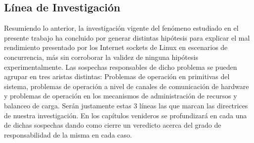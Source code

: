 \subsection{Línea de Investigación}
Resumiendo lo anterior, la investigación vigente del fenómeno estudiado en el presente trabajo ha concluido por generar distintas hipótesis para explicar el mal rendimiento presentado por los Internet sockets de Linux en escenarios de concurrencia, más sin corroborar la validez de ninguna hipótesis experimentalmente. Las sospechas responsables de dicho problema se pueden agrupar en tres aristas distintas: Problemas de operación en primitivas del sistema, problemas de operación a nivel de canales de comunicación de hardware y problemas de operación en los mecanismos de administración de recursos y balanceo de carga. Serán justamente estas 3 líneas las que marcan las directrices de nuestra investigación. En los capítulos venideros se profundizará en cada una de dichas sospechas dando como cierre un veredicto acerca del grado de responsabilidad de la misma en cada caso.
